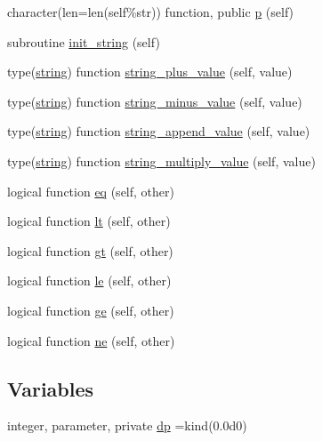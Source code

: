 \begin{DoxyCompactItemize}
\item 
character(len=len(self\%str)) function, public \mbox{\hyperlink{namespacem__strings__oop_a456e651940e317c7bc885d95458c7fcb}{p}} (self)
\item 
subroutine \mbox{\hyperlink{namespacem__strings__oop_a1510c1de10cb182598ce6a399a734be0}{init\+\_\+string}} (self)
\item 
type(\mbox{\hyperlink{structm__strings__oop_1_1string}{string}}) function \mbox{\hyperlink{namespacem__strings__oop_abf27744e539317dac81d6ed1fb736059}{string\+\_\+plus\+\_\+value}} (self, value)
\item 
type(\mbox{\hyperlink{structm__strings__oop_1_1string}{string}}) function \mbox{\hyperlink{namespacem__strings__oop_a0ec84db43ac789bfc02f46f933a3fc9f}{string\+\_\+minus\+\_\+value}} (self, value)
\item 
type(\mbox{\hyperlink{structm__strings__oop_1_1string}{string}}) function \mbox{\hyperlink{namespacem__strings__oop_a64192a93804fcb61ca59725245ee85c2}{string\+\_\+append\+\_\+value}} (self, value)
\item 
type(\mbox{\hyperlink{structm__strings__oop_1_1string}{string}}) function \mbox{\hyperlink{namespacem__strings__oop_a9624f1e09be383f993e7c0e94b230deb}{string\+\_\+multiply\+\_\+value}} (self, value)
\item 
logical function \mbox{\hyperlink{namespacem__strings__oop_a2e5c8d9117609e553db07a1eba18b1fa}{eq}} (self, other)
\item 
logical function \mbox{\hyperlink{namespacem__strings__oop_a332288f9bebc563e12671b514512eb30}{lt}} (self, other)
\item 
logical function \mbox{\hyperlink{namespacem__strings__oop_a25beb184587d7c9fc0a3fd846d4ce187}{gt}} (self, other)
\item 
logical function \mbox{\hyperlink{namespacem__strings__oop_a103e7c1fab92a1c4cbfff87ec8cd1e23}{le}} (self, other)
\item 
logical function \mbox{\hyperlink{namespacem__strings__oop_a2d31ec44898046ba97aebc0de32de19a}{ge}} (self, other)
\item 
logical function \mbox{\hyperlink{namespacem__strings__oop_aa424e1eccc45bb143172d6e212f8e408}{ne}} (self, other)
\end{DoxyCompactItemize}
\subsection*{Variables}
\begin{DoxyCompactItemize}
\item 
integer, parameter, private \mbox{\hyperlink{namespacem__strings__oop_aff89e0d0502f39fedc4f8a9cf793fdba}{dp}} =kind(0.\+0d0)
\end{DoxyCompactItemize}


